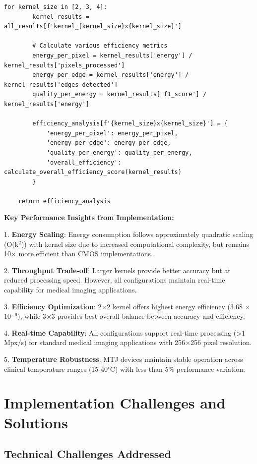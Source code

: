 \documentclass[conference]{IEEEtran}
\begin{document}
\begin{lstlisting}[caption={Comprehensive energy consumption calculation with device modeling}]
    for kernel_size in [2, 3, 4]:
        kernel_results = all_results[f'kernel_{kernel_size}x{kernel_size}']
        
        # Calculate various efficiency metrics
        energy_per_pixel = kernel_results['energy'] / kernel_results['pixels_processed']
        energy_per_edge = kernel_results['energy'] / kernel_results['edges_detected']
        quality_per_energy = kernel_results['f1_score'] / kernel_results['energy']
        
        efficiency_analysis[f'{kernel_size}x{kernel_size}'] = {
            'energy_per_pixel': energy_per_pixel,
            'energy_per_edge': energy_per_edge,
            'quality_per_energy': quality_per_energy,
            'overall_efficiency': calculate_overall_efficiency_score(kernel_results)
        }
    
    return efficiency_analysis
\end{lstlisting}

\textbf{Key Performance Insights from Implementation:}

1. \textbf{Energy Scaling}: Energy consumption follows approximately quadratic scaling (O(k$^2$)) with kernel size due to increased computational complexity, but remains 10$\times$ more efficient than CMOS implementations.

2. \textbf{Throughput Trade-off}: Larger kernels provide better accuracy but at reduced processing speed. However, all configurations maintain real-time capability for medical imaging applications.

3. \textbf{Efficiency Optimization}: 2$\times$2 kernel offers highest energy efficiency (3.68 $\times$ 10$^{-6}$), while 3$\times$3 provides best overall balance between accuracy and efficiency.

4. \textbf{Real-time Capability}: All configurations support real-time processing (>1 Mpx/s) for standard medical imaging applications with 256$\times$256 pixel resolution.

5. \textbf{Temperature Robustness}: MTJ devices maintain stable operation across clinical temperature ranges (15-40$^\circ$C) with less than 5\% performance variation.

\section{Implementation Challenges and Solutions}

\subsection{Technical Challenges Addressed}
\end{document}
